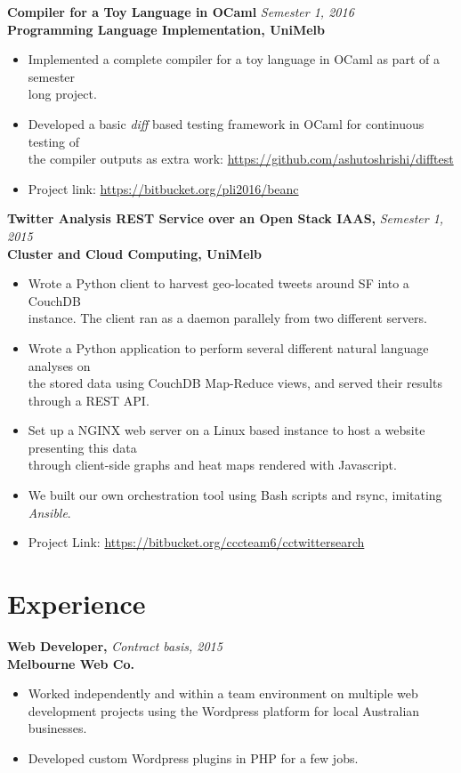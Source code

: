 \documentclass[a4paper,overlapped]{res}
\begin{document}
\begin{resume}
  \textbf{Compiler for a Toy Language in OCaml} \hfill \textit{Semester 1,
    2016}\\
  \textbf{Programming Language Implementation, UniMelb}
  \begin{itemize}
  \item Implemented a complete compiler for a toy language in OCaml as part of
    a semester\\ long project.
  \item Developed a basic \textit{diff} based testing framework in OCaml for
    continuous testing of \\ the compiler outputs as extra work:
    \url{https://github.com/ashutoshrishi/difftest}
  \item Project link: \url{https://bitbucket.org/pli2016/beanc}
  \end{itemize}
  

  \textbf{Twitter Analysis REST Service over an Open Stack IAAS,} 
  \hfill \textit{Semester 1, 2015}\\
  \textbf{Cluster and Cloud Computing, UniMelb}
  \begin{itemize}
  \item Wrote a Python client to harvest geo-located tweets around SF into a
    CouchDB \\
    instance. The client ran as a daemon parallely from two different servers.
  \item Wrote a Python application to perform several different natural
    language analyses on \\ the stored data using CouchDB Map-Reduce
    views, and served their results through a REST API.
  \item Set up a NGINX web server on a Linux based instance to host a website
    presenting this data \\ through client-side graphs and heat maps rendered
    with Javascript.
  \item We built our own orchestration tool using Bash scripts and rsync,
    imitating \textit{Ansible}.
  \item Project Link: \url{https://bitbucket.org/cccteam6/cctwittersearch}
  \end{itemize}
  

  \section{Experience}

  \textbf{Web Developer,} \hfill \textit{Contract basis, 2015}\\
  \textbf{Melbourne Web Co.}
  \begin{itemize}
  \item Worked independently and within a team environment on multiple web 
    development projects using the Wordpress platform for local Australian businesses.
  \item Developed custom Wordpress plugins in PHP for a few jobs.  
  \end{itemize}
  

\end{resume}
\end{document}
